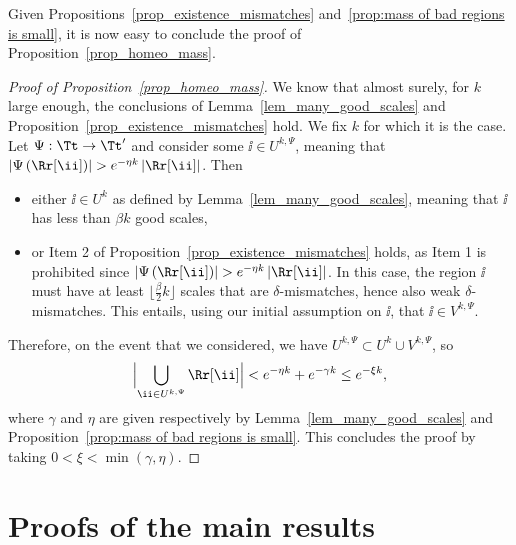 Given Propositions~\ref{prop_existence_mismatches} and~\ref{prop:mass of bad regions is small}, it is now easy to conclude the proof of Proposition~\ref{prop_homeo_mass}.
\begin{proof}[Proof of Proposition~\ref{prop_homeo_mass}]
We know that almost surely, for $k$ large enough, the conclusions of Lemma~\ref{lem_many_good_scales} and Proposition~\ref{prop_existence_mismatches} hold. We fix $k$ for which it is the case.
Let $\Psi: \Tt \to \Tt'$ and consider some $\ii \in U^{k,\Psi}$, meaning that $\left| \Psi \left( \Rr[\ii] \right) \right| > e^{-\eta k} \left| \Rr[\ii] \right|$.
Then
\begin{itemize}
\item either $\ii \in U^k$ as defined by Lemma~\ref{lem_many_good_scales}, meaning that $\ii$ has less than $\beta k$ good scales,
\item or Item 2 of Proposition~\ref{prop_existence_mismatches} holds, as Item 1 is prohibited since $\left| \Psi \left( \Rr[\ii] \right) \right| > e^{-\eta k} \left| \Rr[\ii] \right|$. In this case, the region $\ii$ must have at least $\lfloor \frac{\beta}{2}k \rfloor$ scales that are $\delta$-mismatches, hence also weak $\delta$-mismatches. This entails, using our initial assumption on $\ii$, that $\ii \in V^{k,\Psi}$.
\end{itemize}
Therefore, on the event that we considered, we have $U^{k,\Psi} \subset U^k \cup V^{k,\Psi}$, so
\begin{align*}
\Bigl|\bigcup_{\ii \in U^{k,\Psi}} \Rr[\ii] \Bigr| < e^{-\eta k} + e^{-\gamma k} \leq e^{-\xi k},
\end{align*}
where $\gamma$ and $\eta$ are given respectively by Lemma~\ref{lem_many_good_scales} and Proposition~\ref{prop:mass of bad regions is small}. This concludes the proof by taking $0<\xi<\min(\gamma,\eta)$.
\end{proof}

\section{Proofs of the main results}\label{sec:proof of main results}

